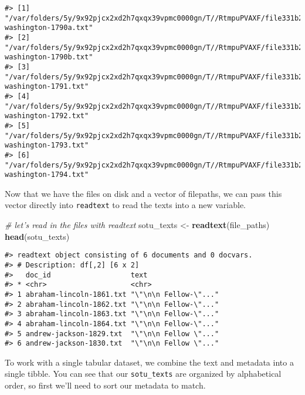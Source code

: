 \documentclass[]{book}
\newenvironment{Shaded}{\begin{snugshade}}{\end{snugshade}}
\newcommand{\CommentTok}[1]{\textcolor[rgb]{0.56,0.35,0.01}{\textit{#1}}}
\newcommand{\KeywordTok}[1]{\textcolor[rgb]{0.13,0.29,0.53}{\textbf{#1}}}
\newcommand{\NormalTok}[1]{#1}
\newcommand{\OperatorTok}[1]{\textcolor[rgb]{0.81,0.36,0.00}{\textbf{#1}}}
\newcommand{\StringTok}[1]{\textcolor[rgb]{0.31,0.60,0.02}{#1}}
\begin{document}
\begin{verbatim}
#> [1] "/var/folders/5y/9x92pjcx2xd2h7qxqx39vpmc0000gn/T//RtmpuPVAXF/file331b2195cdc6/george-washington-1790a.txt"
#> [2] "/var/folders/5y/9x92pjcx2xd2h7qxqx39vpmc0000gn/T//RtmpuPVAXF/file331b2195cdc6/george-washington-1790b.txt"
#> [3] "/var/folders/5y/9x92pjcx2xd2h7qxqx39vpmc0000gn/T//RtmpuPVAXF/file331b2195cdc6/george-washington-1791.txt" 
#> [4] "/var/folders/5y/9x92pjcx2xd2h7qxqx39vpmc0000gn/T//RtmpuPVAXF/file331b2195cdc6/george-washington-1792.txt" 
#> [5] "/var/folders/5y/9x92pjcx2xd2h7qxqx39vpmc0000gn/T//RtmpuPVAXF/file331b2195cdc6/george-washington-1793.txt" 
#> [6] "/var/folders/5y/9x92pjcx2xd2h7qxqx39vpmc0000gn/T//RtmpuPVAXF/file331b2195cdc6/george-washington-1794.txt"
\end{verbatim}

Now that we have the files on disk and a vector of filepaths, we can pass this vector directly into \texttt{readtext} to read the texts into a new variable.

\begin{Shaded}
\begin{Highlighting}[]
\CommentTok{# let's read in the files with readtext}
\NormalTok{sotu_texts <-}\StringTok{ }\KeywordTok{readtext}\NormalTok{(file_paths)}
\KeywordTok{head}\NormalTok{(sotu_texts)}
\end{Highlighting}
\end{Shaded}

\begin{verbatim}
#> readtext object consisting of 6 documents and 0 docvars.
#> # Description: df[,2] [6 x 2]
#>   doc_id                   text                 
#> * <chr>                    <chr>                
#> 1 abraham-lincoln-1861.txt "\"\n\n Fellow-\"..."
#> 2 abraham-lincoln-1862.txt "\"\n\n Fellow-\"..."
#> 3 abraham-lincoln-1863.txt "\"\n\n Fellow-\"..."
#> 4 abraham-lincoln-1864.txt "\"\n\n Fellow-\"..."
#> 5 andrew-jackson-1829.txt  "\"\n\n Fellow \"..."
#> 6 andrew-jackson-1830.txt  "\"\n\n Fellow \"..."
\end{verbatim}

To work with a single tabular dataset, we combine the text and metadata into a single tibble. You can see that our \texttt{sotu\_texts} are organized by alphabetical order, so first we'll need to sort our metadata to match.

\begin{Shaded}
\end{Shaded}
\end{document}
